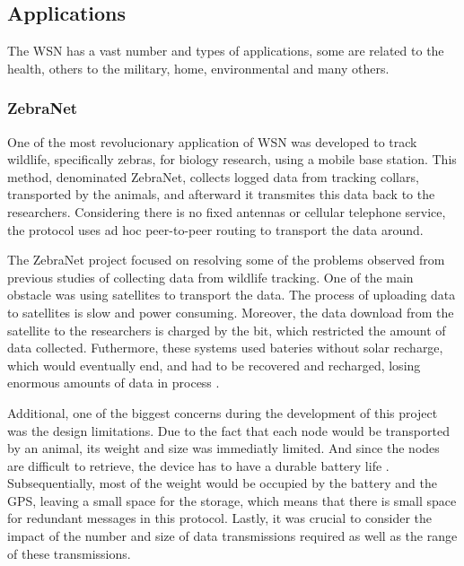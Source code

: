 
\subsection{Applications}
\label{subsec:wsn_applications}
The WSN has a vast number and types of applications, some are related to the health,
others to the military, home, environmental and many others.

\subsubsection{ZebraNet}
\label{subsubsection:zebranet}
One of the most revolucionary application of WSN was developed to track wildlife,
specifically zebras, for biology research, using a mobile base station. This method,
denominated ZebraNet, collects logged data from tracking collars, transported by the
animals, and afterward it transmites this data back to the researchers. Considering there
is no fixed antennas or cellular telephone service, the protocol uses ad hoc
peer-to-peer routing to transport the data around.

The ZebraNet project focused on resolving some of the problems observed from previous
studies of collecting data from wildlife tracking. One of the main obstacle was using
satellites to transport the data. The process of uploading data to satellites is slow and
power consuming. Moreover, the data download from the satellite to the researchers is
charged by the bit, which restricted the amount of data collected. Futhermore, these
systems used bateries without solar recharge, which would eventually end, and had to be
recovered and recharged, losing enormous amounts of data in process \cite{Juang2002}.

Additional, one of the biggest concerns during the development of this project was the
design limitations. Due to the fact that each node would be transported by an animal,
its weight and size was immediatly limited. And since the nodes are difficult to
retrieve, the device has to have a durable battery life \cite{Zhang2004}. Subsequentially,
most of the weight would be occupied by the battery and the \Gls{GPS}, leaving a small
space for the storage, which means that there is small space for redundant messages in this
protocol. Lastly, it was crucial to consider the impact of the number and size of data
transmissions required as well as the range of these transmissions.


